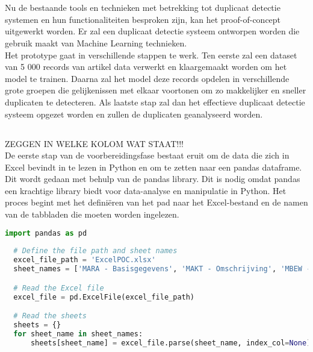 
\chapter{}%
\label{ch:ProofOfConcept}

Nu de bestaande tools en technieken met betrekking tot duplicaat detectie systemen en hun functionaliteiten besproken zijn, kan het proof-of-concept uitgewerkt worden. Er zal een duplicaat detectie systeem ontworpen worden die gebruik maakt van Machine Learning technieken.
\\Het prototype gaat in verschillende stappen te werk. Ten eerste zal een dataset van 5 000 records van artikel data verwerkt en klaargemaakt worden om het model te trainen. Daarna zal het model deze records opdelen in verschillende grote groepen die gelijkenissen met elkaar voortonen om zo makkelijker en sneller duplicaten te detecteren. Als laatste stap zal dan het effectieve duplicaat detectie systeem opgezet worden en zullen de duplicaten geanalyseerd worden.

\section{}%
\label{sec:dataPreparatiePOC}
ZEGGEN IN WELKE KOLOM WAT STAAT!!!
\\De eerste stap van de voorbereidingsfase bestaat eruit om de data die zich in Excel bevindt in te lezen in Python en om te zetten naar een pandas dataframe. Dit wordt gedaan met behulp van de pandas library. Dit is nodig omdat pandas een krachtige library biedt voor data-analyse en manipulatie in Python. Het proces begint met het definiëren van het pad naar het Excel-bestand en de namen van de tabbladen die moeten worden ingelezen.
\begin{lstlisting}[language=Python, caption={Het inlezen van Excel-gegevens in een pandas dataframe}]
  import pandas as pd
  
  # Define the file path and sheet names
  excel_file_path = 'ExcelPOC.xlsx'
  sheet_names = ['MARA - Basisgegevens', 'MAKT - Omschrijving', 'MBEW - Boekhouding']

  # Read the Excel file
  excel_file = pd.ExcelFile(excel_file_path)

  # Read the sheets
  sheets = {}
  for sheet_name in sheet_names:
      sheets[sheet_name] = excel_file.parse(sheet_name, index_col=None)
\end{lstlisting}

